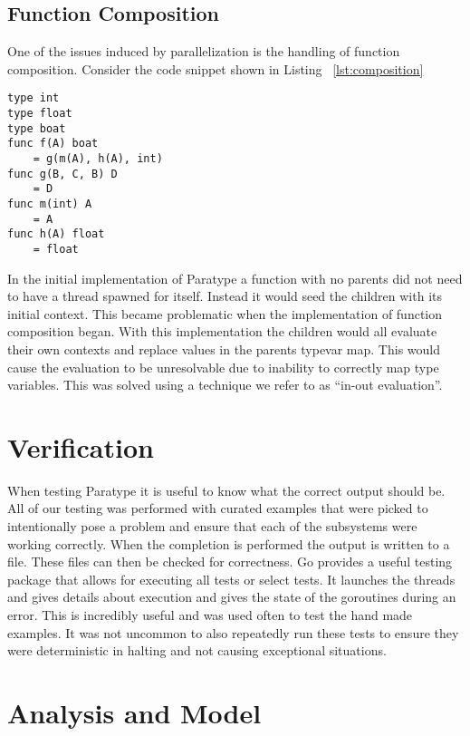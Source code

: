 \documentclass{acm_proc_article-sp}
\begin{document}
	\subsection{Function Composition}
		One of the issues induced by parallelization is the handling of function composition. Consider the code snippet shown in Listing ~\ref{lst:composition}
		\begin{lstlisting}[caption=Small Example of function composition, language=Paratype, label=lst:composition]
type int
type float
type boat
func f(A) boat
	= g(m(A), h(A), int)
func g(B, C, B) D
	= D
func m(int) A
	= A
func h(A) float
	= float
		\end{lstlisting}
		In the initial implementation of Paratype a function with no parents did not need to have a thread spawned for itself. Instead it would seed the children with its initial context. This became problematic when the implementation of function composition began. With this implementation the children would all evaluate their own contexts and replace values in the parents typevar map. This would cause the evaluation to be unresolvable due to inability to correctly map type variables. This was solved using a technique we refer to as ``in-out evaluation''.

\section{Verification}
	When testing Paratype it is useful to know what the correct output should be. All of our testing was performed with curated examples that were picked to intentionally pose a problem and ensure that each of the subsystems were working correctly. When the completion is performed the output is written to a file. These files can then be checked for correctness. Go provides a useful testing package that allows for executing all tests or select tests. It launches the threads and gives details about execution and gives the state of the goroutines during an error. This is incredibly useful and was used often to test the hand made examples. It was not uncommon to also repeatedly run these tests to ensure they were deterministic in halting and not causing exceptional situations.
\section{Analysis and Model}
\end{document}
